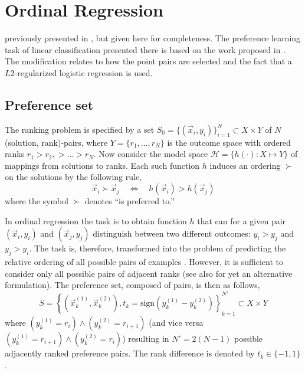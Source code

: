 
\chapter{Ordinal Regression}\label{ch:ordinal} 
 previously presented in \cite{Ru06:PPSN}, but given here for completeness. The preference learning task of linear classification presented there is based on the work proposed in \citep{liblinear,Lin08:newtontrustregion}. The modification relates to how the point pairs are selected and the fact that a $L2$-regularized logistic regression is used. 

\section{Preference set}
The ranking problem is specified by a set $S_{0} = \{(\vec{x}_i,y_i)\}_{i=1}^N \subset X \times Y$ of $N$ (solution, rank)-pairs, where $Y=\{r_1,\ldots,r_N\}$ is the outcome space with ordered ranks $r_1> r_2,> \ldots > r_N$.  
Now consider the model space $\mathcal{H} = \{h(\cdot) : X \mapsto Y\}$ of mappings from solutions to ranks. Each such function $h$ induces an ordering $\succ$ on the solutions  by the following rule,
\begin{equation}\label{eq:linear}
	\vec{x}_i \succ \vec{x}_j \quad \Leftrightarrow \quad h(\vec{x}_i) > h(\vec{x}_j)
\end{equation}
where the symbol $\succ$ denotes ``is preferred to.''  

In ordinal regression the task is to obtain function $h$ that can for a given pair $(\vec{x}_i,y_i)$ and $(\vec{x}_j,y_j)$ distinguish between two different outcomes: $y_i > y_j$ and $y_j > y_i$. The task is, therefore, transformed into the problem of predicting the relative ordering of all possible pairs of examples \citep{Herbrich00,Joachims02}.  However, it is sufficient to consider only all possible pairs of adjacent ranks (see also \cite{ShaweTaylor04:book} for yet an alternative formulation).  The preference set, composed of pairs, is then as follows,
\begin{equation}
	S = \left\{(\vec{x}_k^{(1)}, \vec{x}_k^{(2)}),t_k=\text{sign}(y_k^{(1)} - y_k^{(2)})\right\}_{k=1}^{N'} \subset X\times Y  \label{eq:S}
\end{equation}
where $(y_k^{(1)} = r_i) \wedge (y_k^{(2)} = r_{i+1})$ (and vice versa $(y_k^{(1)} = r_{i+1}) \wedge (y_k^{(2)} = r_{i})$) resulting in $N'=2(N-1)$ possible adjacently ranked preference pairs. The rank difference is denoted by $t_k\in\{-1,1\}$.

